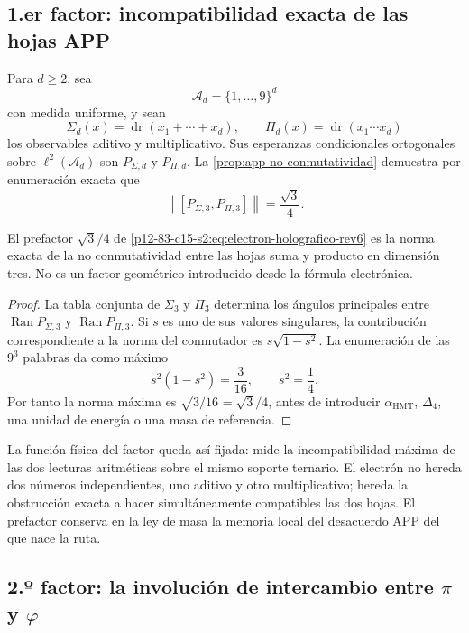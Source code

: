 \subsection{1.er factor: incompatibilidad exacta de las hojas APP}

Para \(d\geq2\), sea
\[
 \mathscr A_d=\{1,\ldots,9\}^d
\]
con medida uniforme, y sean
\[
 \Sigma_d(x)=\operatorname{dr}(x_1+\cdots+x_d),
 \qquad
 \Pi_d(x)=\operatorname{dr}(x_1\cdots x_d)
\]
los observables aditivo y multiplicativo. Sus esperanzas condicionales
ortogonales sobre \(\ell^2(\mathscr A_d)\) son
\(P_{\Sigma,d}\) y \(P_{\Pi,d}\). La
\cref{prop:app-no-conmutatividad} demuestra por enumeración exacta que
\[
 \left\|[P_{\Sigma,3},P_{\Pi,3}]\right\|
 =\frac{\sqrt3}{4}.
\]

\begin{proposition}
\label{p12-83-c15-s2:prop:prefactor-app-electron-rev6}
El prefactor \(\sqrt3/4\) de
\cref{p12-83-c15-s2:eq:electron-holografico-rev6} es la norma exacta de la
no conmutatividad entre las hojas suma y producto en dimensión tres.
No es un factor geométrico introducido desde la fórmula electrónica.
\end{proposition}

\begin{proof}
La tabla conjunta de \(\Sigma_3\) y \(\Pi_3\) determina los ángulos
principales entre
\(\operatorname{Ran}P_{\Sigma,3}\) y
\(\operatorname{Ran}P_{\Pi,3}\). Si \(s\) es uno de sus valores
singulares, la contribución correspondiente a la norma del conmutador es
\(s\sqrt{1-s^2}\). La enumeración de las \(9^3\) palabras da como máximo
\[
 s^2(1-s^2)=\frac3{16},
 \qquad s^2=\frac14.
\]
Por tanto la norma máxima es \(\sqrt{3/16}=\sqrt3/4\), antes de
introducir \(\alpha_{\mathrm{HMT}}\), \(\Delta_4\), una unidad de energía
o una masa de referencia.
\end{proof}

La función física del factor queda así fijada: mide la incompatibilidad
máxima de las dos lecturas aritméticas sobre el mismo soporte ternario. El
electrón no hereda dos números independientes, uno aditivo y otro
multiplicativo; hereda la obstrucción exacta a hacer simultáneamente
compatibles las dos hojas. El prefactor conserva en la ley de masa la
memoria local del desacuerdo APP del que nace la ruta.

\subsection{2.º factor: la involución de intercambio entre \(\pi\) y \(\varphi\)}

